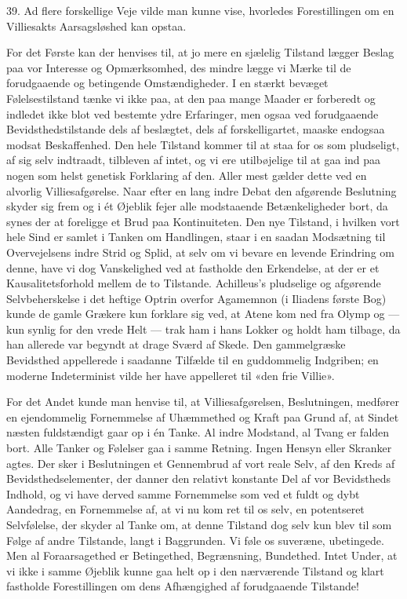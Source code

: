 \documentclass[12pt,a4paper,openany]{book}
\newcommand{\opage}[1]{\marginnote{\footnotesize\textit{[#1]}}}
\begin{document}
39. Ad flere forskellige Veje vilde man kunne vise, hvorledes Forestillingen om
en Villiesakts Aarsagsløshed kan opstaa.

For det Første kan der henvises til, at jo mere en sjælelig Tilstand lægger
Beslag paa vor Interesse og Opmærksomhed, des mindre lægge vi Mærke til de
forudgaaende og betingende Omstændigheder. I en stærkt bevæget Følelsestilstand
tænke vi ikke paa, at den paa mange Maader er forberedt og indledet ikke blot
ved bestemte ydre Erfaringer, men ogsaa ved forudgaaende Bevidsthedstilstande
dels af beslægtet, dels af forskelligartet, maaske endogsaa modsat
Beskaffenhed. Den hele Tilstand kommer til at staa for os som pludseligt, af
sig selv indtraadt, tilbleven af intet, og vi ere utilbøjelige til at gaa ind
paa nogen som helst genetisk Forklaring af den. Aller mest gælder dette ved en
alvorlig Villiesafgørelse. Naar efter en lang indre Debat den afgørende
Beslutning skyder sig frem og i ét Øjeblik fejer alle modstaaende
Betænkeligheder bort, da synes der at foreligge et Brud paa Kontinuiteten. Den
nye Tilstand, i hvilken vort hele Sind er samlet i Tanken om Handlingen, staar
i en saadan Modsætning til Overvejelsens indre Strid og Splid, at selv om vi
bevare en levende Erindring om denne, have vi dog Vanskelighed ved at fastholde
den Erkendelse, at der er et Kausalitetsforhold mellem de to Tilstande.
Achilleus's pludselige og afgørende Selvbeherskelse i det heftige Optrin
overfor Agamemnon (i Iliadens første Bog) kunde de gamle Grækere kun forklare
sig ved, at Atene kom ned fra Olymp og --- kun synlig for den vrede Helt ---
trak ham i hans Lokker og holdt ham tilbage, da han allerede var begyndt at
drage Sværd af Skede. Den gammelgræske Bevidsthed appellerede i saadanne
Tilfælde til en guddommelig Indgriben; en moderne Indeterminist vilde her have
appelleret til «den frie Villie».

For det Andet kunde man henvise til, at Villiesafgørelsen, Beslutningen, medfører
\setcounter{footnote}{0}%
\opage{94}en ejendommelig Fornemmelse af Uhæmmethed og Kraft paa Grund af, at
Sindet næsten fuldstændigt gaar op i én Tanke. Al indre Modstand, al Tvang er
falden bort. Alle Tanker og Følelser gaa i samme Retning. Ingen Hensyn eller
Skranker agtes. Der sker i Beslutningen et Gennembrud af vort reale Selv, af
den Kreds af Bevidsthedselementer, der danner den relativt konstante Del af vor
Bevidstheds Indhold, og vi have derved samme Fornemmelse som ved et fuldt og
dybt Aandedrag, en Fornemmelse af, at vi nu kom ret til os selv, en potentseret
Selvfølelse, der skyder al Tanke om, at denne Tilstand dog selv kun blev til
som Følge af andre Tilstande, langt i Baggrunden. Vi føle os suveræne,
ubetingede. Men al Foraarsagethed er Betingethed, Begrænsning, Bundethed. Intet
Under, at vi ikke i samme Øjeblik kunne gaa helt op i den nærværende Tilstand
og klart fastholde Forestillingen om dens Afhængighed af forudgaaende Tilstande!
\end{document}

